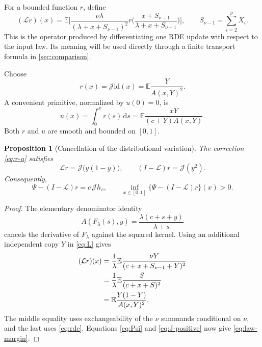 \documentclass[11pt,a4paper]{article}
\numberwithin{equation}{section}
\theoremstyle{notethm}
\newtheorem{proposition}[proposition]{Proposition}
\theoremstyle{definition}
\newcommand{\E}{\mathbb E}
\newcommand{\id}{\mathrm{id}}
\newcommand{\dd}{\,\mathrm d}
\newcommand{\cJ}{\mathcal J}
\newcommand{\cL}{\mathcal L}
\begin{document}
For a bounded function $r$, define
\begin{equation}\label{eq:L}
 (\cL r)(x)=\E\biggl[
 \frac{\nu\lambda}{(\lambda+x+S_{\nu-1})^2}
 r\biggl(\frac{x+S_{\nu-1}}{\lambda+x+S_{\nu-1}}\biggr)
 \biggr],
 \qquad S_{\nu-1}=\sum_{i=2}^{\nu}X_i.
\end{equation}
This is the operator produced by differentiating one RDE update with respect
to the input law. Its meaning will be used directly through a finite
transport formula in \cref{sec:comparison}.

Choose
\begin{equation}\label{eq:r-u}
 \boxed{\quad r(x)=\cJ\id(x)=\E\frac{Y}{A(x,Y)^2}.\quad}
\end{equation}
A convenient primitive, normalized by $u(0)=0$, is
\begin{equation}\label{eq:u-explicit}
 u(x)=\int_0^x r(s)\dd s
     =\E\frac{xY}{(c+Y)A(x,Y)}.
\end{equation}
Both $r$ and $u$ are smooth and bounded on $[0,1]$.

\begin{proposition}[Cancellation of the distributional variation]\label{prop:cancel-law}
The correction \eqref{eq:r-u} satisfies
\begin{equation}\label{eq:Lr}
 \cL r=\cJ\bigl(y(1-y)\bigr),\qquad
 (I-\cL)r=\cJ(y^2).
\end{equation}
Consequently,
\begin{equation}\label{eq:law-margin}
 \boxed{\quad
 \Psi-(I-\cL)r=c\,\cJ h_v,
 \qquad
 \inf_{x\in[0,1]}\{\Psi-(I-\cL)r\}(x)>0.
 \quad}
\end{equation}
\end{proposition}

\begin{proof}
The elementary denominator identity
\begin{equation}\label{eq:denom-F}
 A(F_\lambda(s),y)
 =\frac{\lambda(c+s+y)}{\lambda+s}
\end{equation}
cancels the derivative of $F_\lambda$ against the squared kernel. Using an
additional independent copy $Y$ in \eqref{eq:L} gives
\begin{align}
 (\cL r)(x)
 &=\frac1\lambda\E\frac{\nu Y}{(c+x+S_{\nu-1}+Y)^2}\notag\\
 &=\frac1\lambda\E\frac{S}{(c+x+S)^2}\notag\\
 &=\E\frac{Y(1-Y)}{A(x,Y)^2}.\label{eq:Lr-proof}
\end{align}
The middle equality uses exchangeability of the $\nu$ summands conditional
on $\nu$, and the last uses \eqref{eq:rde}. Equations \eqref{eq:Psi} and
\eqref{eq:J-positive} now give \eqref{eq:law-margin}.
\end{proof}
\end{document}
